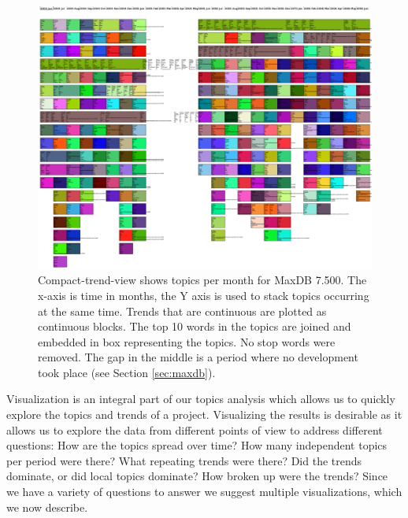 \documentclass[times, 10pt,twocolumn]{article}
\newcommand{\shrinkit}{\vspace*{-.3em}}
\begin{document}
\begin{figure}
  \centering
  \includegraphics[width=1.0\textwidth]{time-smear-plot}%
  \caption{Compact-trend-view shows topics per month for MaxDB
    7.500. The x-axis is time in months, the Y axis is used to stack
    topics occurring at the same time. Trends that are continuous are
    plotted as continuous blocks. The top 10 words in the topics are
    joined and embedded in box representing the topics. No stop words were removed. The gap in the
    middle is a period where no development took place (see Section \ref{sec:maxdb}).}
  \label{fig:topicsmear}
\end{figure}



\shrinkit
{}
\shrinkit
  Visualization is an integral part of our topics analysis which
  allows us to quickly explore the topics and trends of a project.
  Visualizing the results is desirable as it allows us to explore the
  data from different points of view to address different questions:
  How are the topics spread over time?  How many independent topics
  per period were there?  What repeating trends were there?  Did the
  trends dominate, or did local topics dominate?  How broken up were
  the trends?  
  Since we have a variety of questions to answer we suggest multiple
  visualizations, which we now describe.



\end{document}
